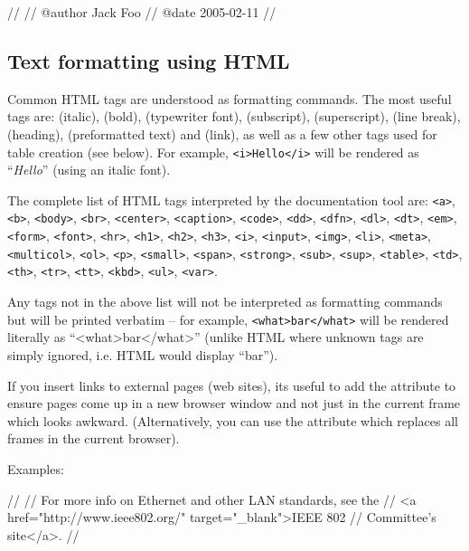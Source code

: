 \begin{ned}
//
// @author Jack Foo
// @date 2005-02-11
//
\end{ned}


\subsection{Text formatting using HTML}

Common HTML tags are understood as formatting commands.
The most useful tags are:  (italic),
 (bold),  (typewriter font),
 (subscript),  (superscript),
 (line break),  (heading),
 (preformatted text) and  (link),
as well as a few other tags used for table creation (see below).
For example, \texttt{<i>Hello</i>} will be rendered as ``\textit{Hello}''
(using an italic font).

The complete list of HTML tags interpreted by the documentation tool are:
\texttt{<a>}, \texttt{<b>}, \texttt{<body>}, \texttt{<br>}, \texttt{<center>},
\texttt{<caption>}, \texttt{<code>}, \texttt{<dd>}, \texttt{<dfn>}, \texttt{<dl>},
\texttt{<dt>}, \texttt{<em>}, \texttt{<form>}, \texttt{<font>}, \texttt{<hr>},
\texttt{<h1>}, \texttt{<h2>}, \texttt{<h3>}, \texttt{<i>}, \texttt{<input>}, \texttt{<img>},
\texttt{<li>}, \texttt{<meta>}, \texttt{<multicol>}, \texttt{<ol>}, \texttt{<p>}, \texttt{<small>},
\texttt{<span>}, \texttt{<strong>},
\texttt{<sub>}, \texttt{<sup>}, \texttt{<table>}, \texttt{<td>}, \texttt{<th>}, \texttt{<tr>},
\texttt{<tt>}, \texttt{<kbd>}, \texttt{<ul>}, \texttt{<var>}.

Any tags not in the above list will not be interpreted as formatting commands
but will be printed verbatim -- for example, \texttt{<what>bar</what>}
will be rendered literally as ``<what>bar</what>'' (unlike HTML where
unknown tags are simply ignored, i.e. HTML would display ``bar'').

If you insert links to external pages (web sites), its useful to add
the  attribute to ensure pages come up in a new
browser window and not just in the current frame which looks awkward.
(Alternatively, you can use the  attribute
which replaces all frames in the current browser).

Examples:

\begin{ned}
//
// For more info on Ethernet and other LAN standards, see the
// <a href="http://www.ieee802.org/" target="_blank">IEEE 802
// Committee's site</a>.
//
\end{ned}

